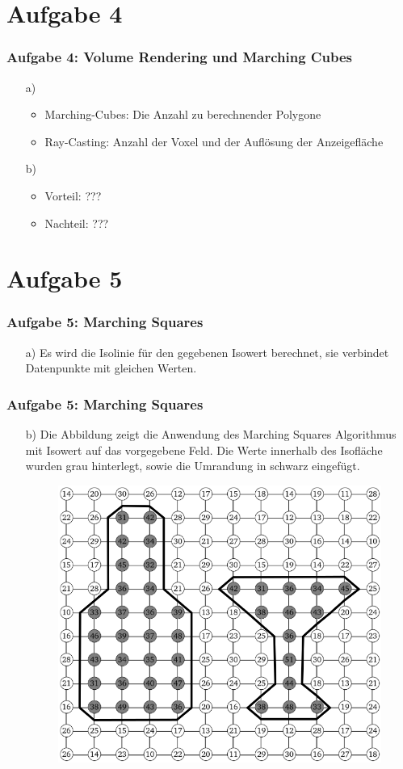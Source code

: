 \documentclass[accentcolor=tud9c,colorbacktitle,inverttitle,landscape,german,presentation,t]{tudbeamer}
\begin{document}
\section{Aufgabe 4}
\begin{frame}
	\frametitle{Aufgabe 4: Volume Rendering und Marching Cubes}
	\begin{itemize}
	\item[a)]
		\begin{itemize}
			\item Marching-Cubes: Die Anzahl zu berechnender Polygone \\
			\item Ray-Casting: Anzahl der Voxel und der Auflösung der Anzeigefläche
		\end{itemize}
	\item[b)] %
	\begin{itemize}
		\item Vorteil: ??? \\
		\item Nachteil: ???
	\end{itemize}
	\end{itemize}
\end{frame}

\section{Aufgabe 5}
\begin{frame}
	\frametitle{Aufgabe 5: Marching Squares}
	\begin{itemize}
		\item[a)] Es wird die Isolinie für den gegebenen Isowert berechnet, sie verbindet Datenpunkte mit gleichen Werten.
		
	\end{itemize}
\end{frame}
\begin{frame}
	\frametitle{Aufgabe 5: Marching Squares}
	\begin{itemize}
		\item[b)]
		Die Abbildung zeigt die Anwendung des Marching Squares Algorithmus mit Isowert auf das vorgegebene Feld. Die Werte innerhalb des Isofläche wurden grau hinterlegt, sowie die Umrandung in schwarz eingefügt.
		\begin{figure}
			\includegraphics[width = .4\linewidth]{task_5b.png}
			\label{MaSq}
		\end{figure}
	\end{itemize}
\end{frame}
\end{document}
